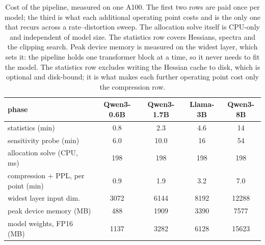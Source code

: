 \begin{table}[H]
\centering
\footnotesize
\setlength{\tabcolsep}{3pt}
\caption{Cost of the pipeline, measured on one A100. The first two rows are paid once per model; the third is what each additional operating point costs and is the only one that recurs across a rate--distortion sweep. The allocation solve itself is CPU-only and independent of model size. The statistics row covers Hessians, spectra and the clipping search. Peak device memory is measured on the widest layer, which sets it: the pipeline holds one transformer block at a time, so it never needs to fit the model. The statistics row excludes writing the Hessian cache to disk, which is optional and disk-bound; it is what makes each further operating point cost only the compression row.}
\label{tab:runtime}
\begin{tabular}{lcccc}
\toprule
phase & Qwen3-0.6B & Qwen3-1.7B & Llama-3B & Qwen3-8B \\
\midrule
statistics (min) & 0.8 & 2.3 & 4.6 & 14 \\
sensitivity probe (min) & 6.0 & 10.0 & 16 & 54 \\
allocation solve (CPU, ms) & 198 & 198 & 198 & 198 \\
compression + PPL, per point (min) & 0.9 & 1.9 & 3.2 & 7.0 \\
\midrule
widest layer input dim. & 3072 & 6144 & 8192 & 12288 \\
peak device memory (MB) & 488 & 1909 & 3390 & 7577 \\
model weights, FP16 (MB) & 1137 & 3282 & 6128 & 15623 \\
\bottomrule
\end{tabular}
\end{table}
